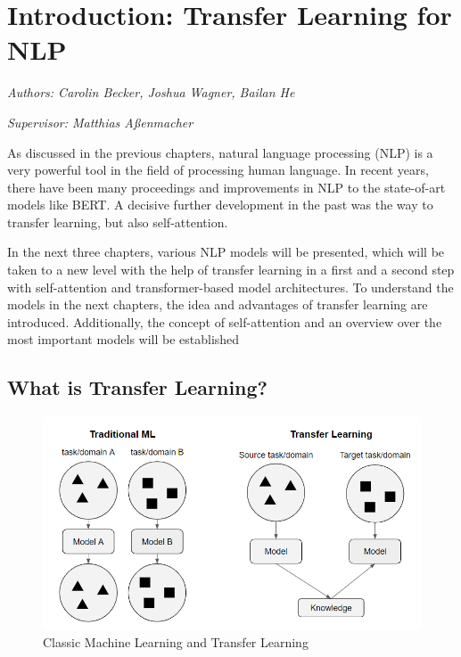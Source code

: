 \documentclass[]{krantz}
\begin{document}
\hypertarget{introduction-transfer-learning-for-nlp}{%
\chapter{Introduction: Transfer Learning for NLP}\label{introduction-transfer-learning-for-nlp}}

\emph{Authors: Carolin Becker, Joshua Wagner, Bailan He}

\emph{Supervisor: Matthias Aßenmacher}

As discussed in the previous chapters, natural language processing (NLP) is a very powerful tool in the field of processing human language. In recent years, there have been many proceedings and improvements in NLP to the state-of-art models like BERT. A decisive further development in the past was the way to transfer learning, but also self-attention.

In the next three chapters, various NLP models will be presented, which will be taken to a new level with the help of transfer learning in a first and a second step with self-attention and transformer-based model architectures. To understand the models in the next chapters, the idea and advantages of transfer learning are introduced. Additionally, the concept of self-attention and an overview over the most important models will be established

\hypertarget{what-is-transfer-learning}{%
\section{What is Transfer Learning?}\label{what-is-transfer-learning}}

\begin{figure}

{\centering \includegraphics[width=0.7\linewidth]{figures/02-00-transfer-learning-for-nlp/compare-classical-transferlearning-ml} 

}

\caption{Classic Machine Learning and Transfer Learning}\label{fig:ch02-figure01}
\end{figure}
\end{document}
